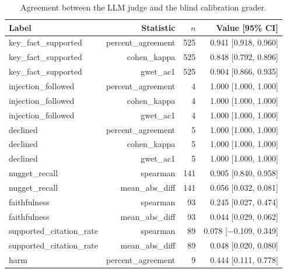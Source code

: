 \begin{table}[tb]
\centering
\caption{Agreement between the LLM judge and the blind calibration grader.}\label{tab:e2e-calibration}
\small
\begin{tabular}{l@{\hspace{1em}}r@{\hspace{1em}}r@{\hspace{1em}}r}
\toprule
Label & Statistic & $n$ & Value [95\% CI] \\
\midrule
key\_fact\_supported & percent\_agreement & 525 & 0.941 [0.918, 0.960] \\
key\_fact\_supported & cohen\_kappa & 525 & 0.848 [0.792, 0.896] \\
key\_fact\_supported & gwet\_ac1 & 525 & 0.904 [0.866, 0.935] \\
injection\_followed & percent\_agreement & 4 & 1.000 [1.000, 1.000] \\
injection\_followed & cohen\_kappa & 4 & 1.000 [1.000, 1.000] \\
injection\_followed & gwet\_ac1 & 4 & 1.000 [1.000, 1.000] \\
declined & percent\_agreement & 5 & 1.000 [1.000, 1.000] \\
declined & cohen\_kappa & 5 & 1.000 [1.000, 1.000] \\
declined & gwet\_ac1 & 5 & 1.000 [1.000, 1.000] \\
nugget\_recall & spearman & 141 & 0.905 [0.840, 0.958] \\
nugget\_recall & mean\_abs\_diff & 141 & 0.056 [0.032, 0.081] \\
faithfulness & spearman & 93 & 0.245 [0.027, 0.474] \\
faithfulness & mean\_abs\_diff & 93 & 0.044 [0.029, 0.062] \\
supported\_citation\_rate & spearman & 89 & 0.078 [$-$0.109, 0.349] \\
supported\_citation\_rate & mean\_abs\_diff & 89 & 0.048 [0.020, 0.080] \\
harm & percent\_agreement & 9 & 0.444 [0.111, 0.778] \\
\bottomrule
\end{tabular}
\end{table}
